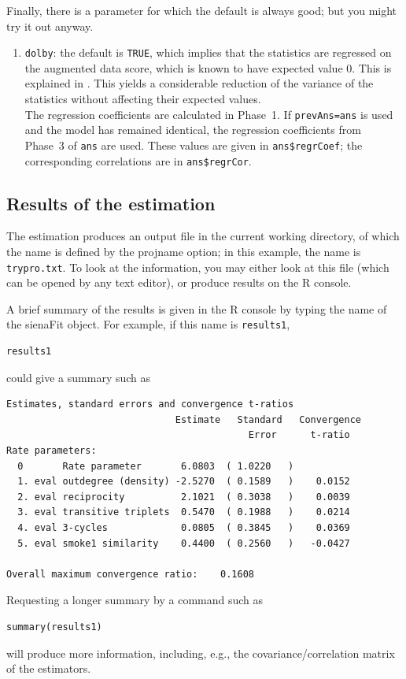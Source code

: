 \documentclass[a4paper,fleqn,11pt]{article}
\newcommand{\+}{\, + \,}
\newcommand{\sfn}[1]{\textsf{#1}}
\newcommand{\R}{{\sf R }}
\begin{document}
Finally, there is a parameter for which the default is always good;
but you might try it out anyway.
\begin{enumerate}[resume]
  \item \texttt{dolby}: the default is \texttt{TRUE}, which implies that the
   statistics are regressed on the augmented data score, which is known to have
   expected value 0. This is explained in \citet{Snijders2013Greenwich}.
   This yields a considerable reduction of the variance of the statistics
   without affecting their expected values.\\
   The regression coefficients are calculated in Phase~1.
   If \texttt{prevAns=ans} is used
   and the model has remained identical, the regression coefficients from
   Phase~3 of \texttt{ans} are used.
   These values are given in \texttt{ans\$regrCoef};
   the corresponding correlations are in \texttt{ans\$regrCor}.

\end{enumerate}

\subsection{Results of the estimation}

The estimation produces an output file in the current working directory,
of which the name is defined by the \textsf{projname} option;
in this example, the name is \texttt{trypro.txt}.
To look at the information, you may either look at this file
(which can be opened by any text editor), or produce results on the \R console.

A brief summary of the results is given in the \R console by
typing the name of the  \sfn{sienaFit} object. For example,
if this name is \texttt{results1},
\begin{verbatim}
results1
\end{verbatim}
could give a summary such as
\par
{\footnotesize
\begin{verbatim}
Estimates, standard errors and convergence t-ratios
                              Estimate   Standard   Convergence
                                           Error      t-ratio
Rate parameters:
  0       Rate parameter       6.0803  ( 1.0220   )
  1. eval outdegree (density) -2.5270  ( 0.1589   )    0.0152
  2. eval reciprocity          2.1021  ( 0.3038   )    0.0039
  3. eval transitive triplets  0.5470  ( 0.1988   )    0.0214
  4. eval 3-cycles             0.0805  ( 0.3845   )    0.0369
  5. eval smoke1 similarity    0.4400  ( 0.2560   )   -0.0427

Overall maximum convergence ratio:    0.1608
\end{verbatim}
}
Requesting a longer summary by a command such as
\begin{verbatim}
summary(results1)
\end{verbatim}
will produce more information, including, e.g.,
the covariance/correlation matrix of the estimators.
\bigskip
\end{document}

